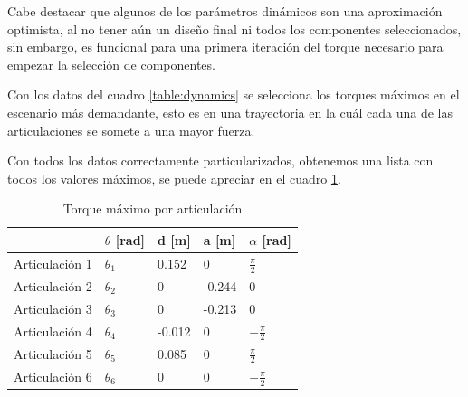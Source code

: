 Cabe destacar que algunos de los parámetros dinámicos son una aproximación optimista, al no tener aún un diseño final ni todos los componentes seleccionados, sin embargo, es funcional para una primera iteración del torque necesario para empezar la selección de componentes.

Con los datos del cuadro \ref{table:dynamics} se selecciona los torques máximos en el escenario más demandante, esto es en una trayectoria en la cuál cada una de las articulaciones se somete a una mayor fuerza.

Con todos los datos correctamente particularizados, obtenemos una lista con todos los valores máximos, se puede apreciar en el cuadro \ref{table:maxtorque}. 

\begin{table}[h]
\centering
\caption{Torque máximo por articulación}
\label{table:maxtorque}
\begin{tabular}{l|l|l|l|l|}
               & $\theta$ [rad] & d [m]    & a [m]   & $\alpha$ [rad]                        \\ 
\hline
Articulación 1 & $\theta_1$              & 0.152    & 0       & $\frac{\pi}{2}$   \\
Articulación 2 & $\theta_2$              & 0        & -0.244       & 0 \\
Articulación 3 & $\theta_3$                  & 0 & -0.213       & 0                                                  \\
Articulación 4 & $\theta_4$              & -0.012        & 0 & $-\frac{\pi}{2}$   \\
Articulación 5 & $\theta_5$                        & 0.085        & 0 & $\frac{\pi}{2}$  \\
Articulación 6 & $\theta_6$                           & 0        & 0  & $-\frac{\pi}{2}$                                                 
\end{tabular}
\end{table}


  